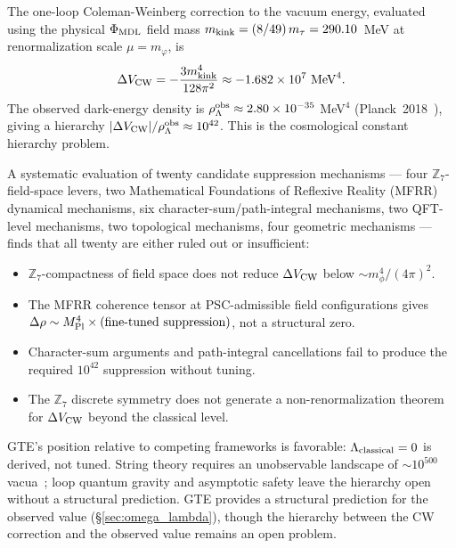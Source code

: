 \documentclass[11pt]{article}
\theoremstyle{remark}
\newcommand{\ZS}{\mathbb{Z}_7}
\newcommand{\MPl}{M_{\rm Pl}}
\begin{document}
The one-loop Coleman-Weinberg correction to the vacuum energy, evaluated using the
physical $\Phi_{\rm MDL}$ field mass $m_{\rm kink} = (8/49)\,m_\tau = 290.10$~MeV at
renormalization scale $\mu = m_\varphi$, is
\begin{equation}
  \Delta V_{\rm CW} = -\frac{3m_{\rm kink}^4}{128\pi^2} \approx -1.682\times10^{7}~\text{MeV}^4.
\end{equation}
The observed dark-energy density is $\rho_\Lambda^{\rm obs}\approx 2.80\times10^{-35}$
MeV$^4$ (Planck~2018~\cite{Planck2018}), giving a hierarchy
$|\Delta V_{\rm CW}|/\rho_\Lambda^{\rm obs}\approx 10^{42}$.  This is the cosmological
constant hierarchy problem.

A systematic evaluation of twenty candidate suppression mechanisms --- four
$\ZS$-field-space levers, two Mathematical Foundations of Reflexive Reality (MFRR) dynamical mechanisms, six
character-sum/path-integral mechanisms, two QFT-level mechanisms, two
topological mechanisms, four geometric mechanisms --- finds that all twenty are either
ruled out or insufficient:
\begin{itemize}[noitemsep]
\item $\ZS$-compactness of field space does not reduce $\Delta V_{\rm CW}$ below
  $\sim m_\phi^4/(4\pi)^2$.
\item The MFRR coherence tensor at PSC-admissible field configurations gives
  $\Delta\rho\sim\MPl^4\times(\text{fine-tuned suppression})$, not a structural zero.
\item Character-sum arguments and path-integral cancellations fail to produce
  the required $10^{42}$ suppression without tuning.
\item The $\ZS$ discrete symmetry does not generate a non-renormalization theorem
  for $\Delta V_{\rm CW}$ beyond the classical level.
\end{itemize}

GTE's position relative to competing frameworks is favorable: $\Lambda_{\rm classical}=0$
is derived, not tuned.  String theory requires an unobservable landscape of $\sim
10^{500}$ vacua~\cite{Susskind2005}; loop quantum gravity and asymptotic safety leave the
hierarchy open without a structural prediction.  GTE provides a structural prediction for
the observed value (\S\ref{sec:omega_lambda}), though the hierarchy between the CW
correction and the observed value remains an open problem.
\end{document}
